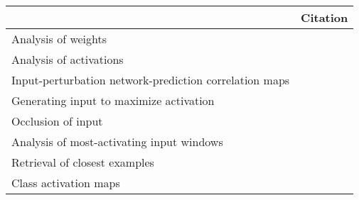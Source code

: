 \begin{tabular}{ll}
\toprule
{} &                                                                                                                                                                                          Citation \\
\midrule
Analysis of weights                                    &  \cite{Perez-Benitez2018, Yoon2018, Langkvist2018, Deiss2018, Lawhern2018, Xu2016, Tsinalis2016a, Nurse2016, Tabar2016a, Zheng2015, Stober2015, Manor2015, Yang2015a, Langkvist2012, Cecotti2011} \\
Analysis of activations                                &                                                                                           \cite{Yuan2018a, Waytowich2018, Lawhern2018, kwak2017, Yin2017a, Supratak2017, Shamwell2016, Manor2015} \\
Input-perturbation network-prediction correlation maps &                                                                                                              \cite{Schirrmeister2017a, Volker2018, Hartmann2018b, Behncke2017, Schirrmeister2017} \\
Generating input to maximize activation                &                                                                                                                                      \cite{VanPutten2018b, Ruffini2018a, Sors2018, Bashivan2016a} \\
Occlusion of input                                     &                                                                                                                                                        \cite{Lee2018, Chambon2018, Thodoroff2016} \\
Analysis of most-activating input windows              &                                                                                                                                                                              \cite{Hartmann2018b} \\
Retrieval of closest examples                          &                                                                                                                                                                                  \cite{Deiss2018} \\
Class activation maps                                  &                                                                                                                                                                                  \cite{Ghosh2018} \\

\end{tabular}
